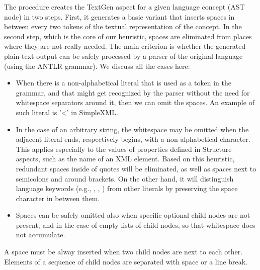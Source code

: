 The procedure creates the TextGen aspect for a given language concept (AST node) in two steps.
First, it generates a basic variant that inserts spaces in between every two tokens of the textual representation of the concept.
In the second step, which is the core of our heuristic, spaces are eliminated from places where they are not really needed.
The main criterion is whether the generated plain-text output can be safely processed by a parser of the original language (using the ANTLR grammar).
We discuss all the cases here:
\begin{itemize}
	\item When there is a non-alphabetical literal that is used as a token in the grammar, and that might get recognized by the parser without the need for whitespace separators around it, then we can omit the spaces. An example of such literal is '\textless' in SimpleXML.
	\item In the case of an arbitrary string, the whitespace may be omitted when the adjacent literal ends, respectively begins, with a non-alphabetical character.
		This applies especially to the values of properties defined in Structure aspects, such as the name of an XML element.
		Based on this heuristic, redundant spaces inside of quotes will be eliminated, as well as spaces next to semicolons and around brackets.
		On the other hand, it will distinguish language keywords (e.g., , , ) from other literals by preserving the space character in between them.
	\item Spaces can be safely omitted also when specific optional child nodes are not present, and in the case of empty lists of child nodes, so that whitespace does not accumulate.
\end{itemize}
A space must be alway inserted when two child nodes are next to each other.
Elements of a sequence of child nodes are separated with space or a line break.


